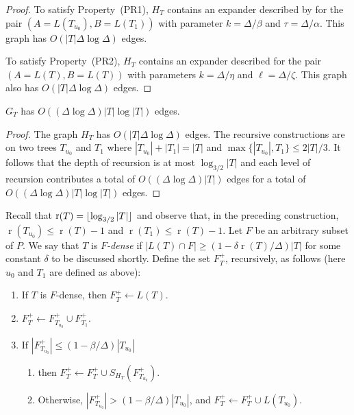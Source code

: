 \documentclass{patmorin}
\DeclareMathOperator{\rank}{r}
\begin{document}
\begin{proof}
  To satisfy Property~(PR1), $H_T$ contains an expander described
  by  for the pair $(A=L(T_{u_0}),B=L(T_1))$ with
  parameter $k=\Delta/\beta$ and $\tau=\Delta/\alpha$.  This graph has
  $O(|T|\Delta\log\Delta)$ edges.

  To satisfy Property~(PR2), $H_T$ contains an expander described
   for the pair $(A=L(T),B=L(T))$ with
  parameters $k=\Delta/\eta$ and $\ell=\Delta/\zeta$. This graph also
  has $O(|T|\Delta\log\Delta)$ edges.
\end{proof}


\begin{clm}
  $G_{T}$ has $O((\Delta\log\Delta)|T|\log |T|)$ edges.
\end{clm}

\begin{proof}
  The graph $H_T$ has
  $O(|T|\Delta\log\Delta)$ edges.  The recursive constructions are on two trees $T_{u_0}$
  and $T_1$ where $|T_{u_0}|+|T_1|=|T|$ and $\max\{|T_{u_0}|,T_1\}\le
  2|T|/3$. It follows that the depth of recursion is at most
  $\log_{3/2}|T|$ and each level of recursion contributes a total of
  $O((\Delta\log\Delta)|T|)$ edges for a total of $O((\Delta\log\Delta)|T|\log|T|)$ edges.
\end{proof}

Recall that $\rank(T)=\floor{\log_{3/2} |T|}$ and observe that, in
the preceding construction, $\rank(T_{u_0}) \le \rank(T)-1$ and
$\rank(T_1)\le\rank(T)-1$.  Let $F$ be an arbitrary subset of $P$.  We say
that $T$ is \emph{$F$-dense} if $|L(T)\cap F|\ge (1-\delta\rank(T)/\Delta)|T|$
for some constant $\delta$ to be discussed shortly.  Define the set
$F^+_T$, recursively, as follows (here $u_0$ and $T_1$ are defined as above):

\begin{enumerate}
  \item If $T$ is $F$-dense, then $F^+_T\gets L(T)$. 
  \item $F^+_T\gets F^+_{T_{u_0}}\cup F^+_{T_1}$. 
  \item If $|F^+_{T_{u_0}}|\le (1-\beta/\Delta)|T_{u_0}|$
  \begin{enumerate}
     \item then $F^+_T\gets F^+_T\cup S_{H_T}(F^+_{T_{u_0}})$. 
     \item Otherwise, $|F^+_{T_{u_0}}|> (1-\beta/\Delta)|T_{u_0}|$,
          and $F^+_T\gets F^+_T\cup L(T_{u_0})$.
  \end{enumerate}
\end{enumerate}
\end{document}

